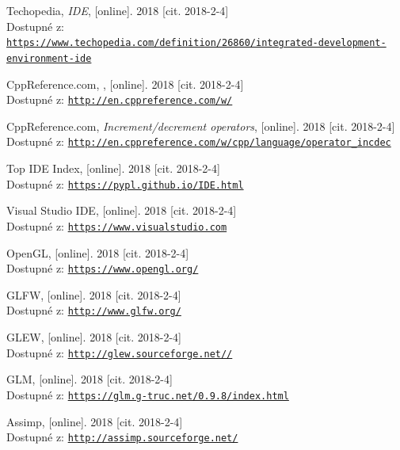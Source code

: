 \documentclass[czech,public,dept460,male,cpdeclaration]{diploma}
\begin{document}
\begin{thebibliography}{99}
	 Techopedia,
		\textit{IDE}, [online]. 2018 [cit. 2018-2-4]\\
		Dostupné z:\\ \href{https://www.techopedia.com/definition/26860/integrated-development-environment-ide}{\texttt{https://www.techopedia.com/definition/26860/integrated-development-environment-ide}}
		
	 CppReference.com,
		, [online]. 2018 [cit. 2018-2-4]\\
		Dostupné z: \href{http://en.cppreference.com/w/}{\texttt{http://en.cppreference.com/w/}}
		
	 CppReference.com,
		\textit{Increment/decrement operators}, [online]. 2018 [cit. 2018-2-4]\\
		Dostupné z: \href{http://en.cppreference.com/w/cpp/language/operator\_incdec}{\texttt{http://en.cppreference.com/w/cpp/language/operator\_incdec}}
		
	 Top IDE Index,
		[online]. 2018 [cit. 2018-2-4]\\
		Dostupné z: \href{https://pypl.github.io/IDE.html}{\texttt{https://pypl.github.io/IDE.html}}
		
	 Visual Studio IDE,
		[online]. 2018 [cit. 2018-2-4]\\
		Dostupné z: \href{https://www.visualstudio.com}{\texttt{https://www.visualstudio.com}}
		
	 OpenGL,
		[online]. 2018 [cit. 2018-2-4]\\
		Dostupné z: \href{https://www.opengl.org/}{\texttt{https://www.opengl.org/}}
		
	 GLFW,
		[online]. 2018 [cit. 2018-2-4]\\
		Dostupné z: \href{http://www.glfw.org/}{\texttt{http://www.glfw.org/}}
		
	 GLEW,
		[online]. 2018 [cit. 2018-2-4]\\
		Dostupné z: \href{http://glew.sourceforge.net/}{\texttt{http://glew.sourceforge.net//}}
		
	 GLM,
		[online]. 2018 [cit. 2018-2-4]\\
		Dostupné z: \href{https://glm.g-truc.net/0.9.8/index.html}{\texttt{https://glm.g-truc.net/0.9.8/index.html}}
		
	 Assimp,
		[online]. 2018 [cit. 2018-2-4]\\
		Dostupné z: \href{http://assimp.sourceforge.net/}{\texttt{http://assimp.sourceforge.net/}}
		

\end{thebibliography}
\end{document}
